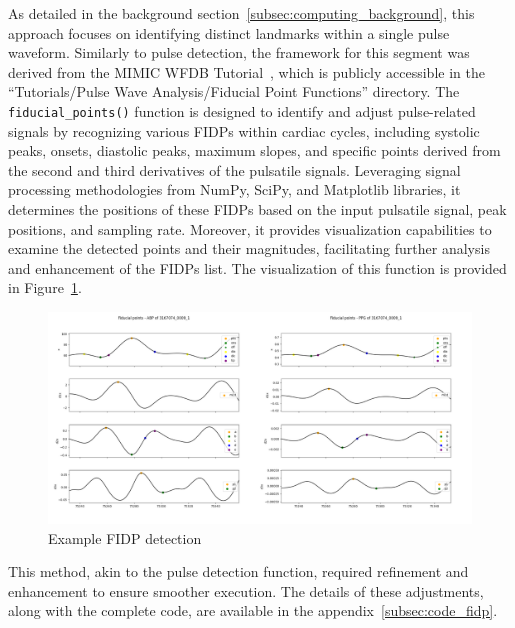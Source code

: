 As detailed in the background section~\ref{subsec:computing_background}, this approach focuses on identifying distinct landmarks within a single pulse waveform.
Similarly to pulse detection, the framework for this segment was derived from the MIMIC WFDB Tutorial~\cite{charltonMIMICWFDBTutorials2022}, which is publicly accessible in the \enquote{Tutorials/Pulse Wave Analysis/Fiducial Point Functions} directory.
The \texttt{fiducial\_points()} function is designed to identify and adjust pulse-related signals by recognizing various FIDPs within cardiac cycles,
including systolic peaks, onsets, diastolic peaks, maximum slopes, and specific points derived from the second and third derivatives of the pulsatile signals.
Leveraging signal processing methodologies from NumPy, SciPy, and Matplotlib libraries, it determines the positions of these FIDPs based on the input pulsatile signal, peak positions, and sampling rate.
Moreover, it provides visualization capabilities to examine the detected points and their magnitudes, facilitating further analysis and enhancement of the FIDPs list.
The visualization of this function is provided in Figure~\ref{fig:wfdb_fidp}.

\begin{figure}[h]
    \hspace{-1.75cm}
    \includegraphics[width=1.275\textwidth]{images/methods/fidps}
    \vspace{-1.2cm}
    \captionsetup{format=plain, justification=centering, font=small}
    \caption{Example FIDP detection}
    \label{fig:wfdb_fidp}
\end{figure}

This method, akin to the pulse detection function, required refinement and enhancement to ensure smoother execution.
The details of these adjustments, along with the complete code, are available in the appendix~\ref{subsec:code_fidp}.

